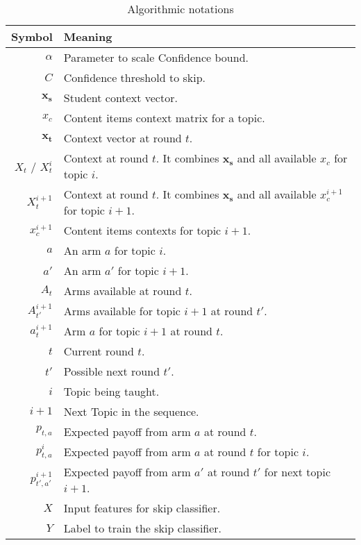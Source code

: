 \begin{table}[H]
\centering
\label{Table 1 : Notations}
\begin{tabularx}{\linewidth}{ @{} r X @{} }
     \hline
     Symbol & Meaning \\
     \hline
     $\alpha$  & Parameter to scale Confidence bound.  \\ 
     $C$ & Confidence threshold to skip. \\
     $\mathbf{x_s}$ & Student context vector. \\
     ${x_c}$ & Content items context matrix for a topic. \\
     $\mathbf{x_t}$ & Context vector at round $t$. \\
     $X_{t}$ / $X^{i}_{t}$  & Context at round $t$. It combines $\mathbf{x_s}$ and all available $x_c$ for topic $i$. \\
     $X^{i+1}_{t}$  & Context at round $t$. It combines $\mathbf{x_s}$ and all available $x^{i+1}_c$ for topic $i+1$. \\
     $x^{i+1}_c$ & Content items contexts for topic $i+1$. \\
     $a$ & An arm $a$ for topic $i$.\\
     $a'$ & An arm $a'$ for topic $i+1$.\\
     $A_t$ & Arms available at round $t$. \\
     $A^{i+1}_{t'}$ & Arms available for topic $i+1$ at round $t'$. \\
     $a^{i+1}_t$ & Arm $a$ for topic $i+1$ at round $t$. \\
     $t$ & Current round $t$. \\
     $t'$ & Possible next round $t'$. \\
     $i$ & Topic being taught. \\
     $i+1$ & Next Topic in the sequence. \\
     $p_{t,a}$ & Expected payoff from arm $a$  at round $t$. \\ 
     $p^{i}_{t,a}$ & Expected payoff from arm $a$ at round $t$ for topic $i$. \\
     $p^{i+1}_{t',a'}$ & Expected payoff from arm $a'$ at round $t'$ for next topic $i+1$. \\
     $X$ & Input features for skip classifier. \\
     $Y$ & Label to train the skip classifier. \\ 
   \hline   
\end{tabularx}
\caption{Algorithmic notations}
\end{table}

